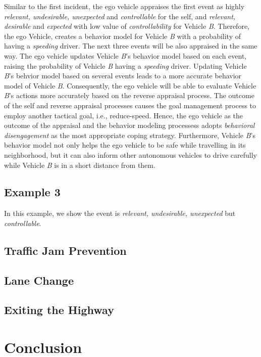 \documentclass[journal, 11pt]{IEEEtran}
\begin{document}
Similar to the first incident, the ego vehicle appraises the first event as
highly \textit{relevant, undesirable, unexpected} and \textit{controllable} for
the self, and \textit{relevant, desirable} and \textit{expected} with low value
of \textit{controllability} for Vehicle \textit{B}. Therefore, the ego Vehicle,
creates a behavior model for Vehicle \textit{B} with a probability of having
a \textit{speeding} driver. The next three events will be also appraised in the
same way. The ego vehicle updates Vehicle \textit{B}'s behavior model based on
each event, raising the probability of Vehicle \textit{B} having a
\textit{speeding} driver. Updating Vehicle \textit{B}'s behvior model based on
several events leads to a more accurate behavior model of Vehicle \textit{B}.
Consequently, the ego vehicle will be able to evaluate Vehicle \textit{B}'s
actions more accurately based on the reverse appraisal process. The outcome of
the self and reverse appraisal processes causes the goal management process to
employ another tactical goal, i.e., reduce-speed. Hence, the ego vehicle as the
outcome of the appraisal and the behavior modeling processess adopts
\textit{behavioral disengagement} as the most appropriate coping strategy.
Furthermore, Vehicle \textit{B}'s behavior model not only helps the ego vehicle
to be safe while travelling in its neighborhood, but it can also inform other
autonomous vehicles to drive carefully while Vehicle \textit{B} is in a short
distance from them.

\subsection{Example 3}
In this example, we show the event is \textit{relevant, undesirable, unexpected}
but \textit{controllable}.

\subsection{Traffic Jam Prevention}
\label{sec:lane-change}

\subsection{Lane Change}
\label{sec:lane-change}

\subsection{Exiting the Highway}
\label{sec:exit-highway}

\section{Conclusion}
\label{Conc}
%



% 
\end{document}
